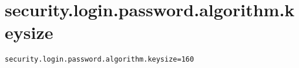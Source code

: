 \section{security.login.password.algorithm.keysize}
\label{configuration:SecurityLoginPasswordAlgorithmKeysize}
\ClearAPI
\TODO
{}
\begin{lstlisting}[style=Props,caption={Usage example for \textit{security.login.password.algorithm.keysize}}]
security.login.password.algorithm.keysize=160
\end{lstlisting}
